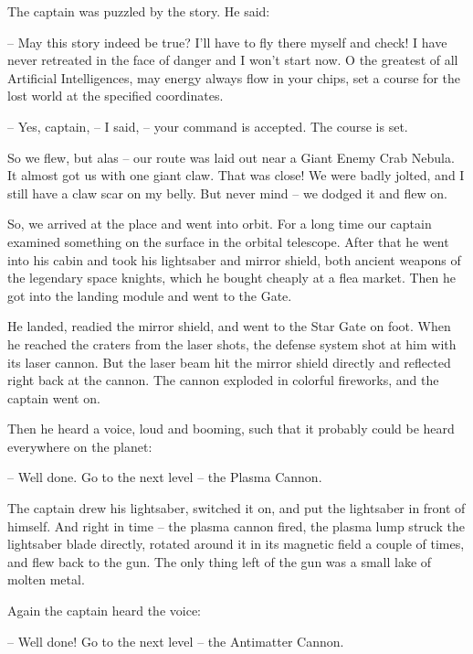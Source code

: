 \documentclass[ebook,twoside,final,openright]{memoir}
\begin{document}
\par
The captain was puzzled by the story. He said:\par
– May this story indeed be true? I’ll have to fly there myself and check! I have never retreated in the face of danger and I won’t start now. O the greatest of all Artificial Intelligences, may energy always flow in your chips, set a course for the lost world at the specified coordinates.\par
– Yes, captain, – I said, – your command is accepted. The course is set.\par
So we flew, but alas – our route was laid out near a Giant Enemy Crab Nebula. It almost got us with one giant claw. That was close! We were badly jolted, and I still have a claw scar on my belly. But never mind – we dodged it and flew on. \par
\par
So, we arrived at the place and went into orbit. For a long time our captain examined something on the surface in the orbital telescope. After that he went into his cabin and took his lightsaber and mirror shield, both ancient weapons of the legendary space knights, which he bought cheaply at a flea market. Then he got into the landing module and went to the Gate.\par
\par
He landed, readied the mirror shield, and went to the Star Gate on foot. When he reached the craters from the laser shots, the defense system shot at him with its laser cannon. But the laser beam hit the mirror shield directly and reflected right back at the cannon. The cannon exploded in colorful fireworks, and the captain went on.\par
\par
Then he heard a voice, loud and booming, such that it probably could be heard everywhere on the planet:\par
– Well done. Go to the next level – the Plasma Cannon.\par
The captain drew his lightsaber, switched it on, and put the lightsaber in front of himself. And right in time – the plasma cannon fired, the plasma lump struck the lightsaber blade directly, rotated around it in its magnetic field a couple of times, and flew back to the gun. The only thing left of the gun was a small lake of molten metal.\par
\par
Again the captain heard the voice:\par
– Well done! Go to the next level – the Antimatter Cannon.\par
\end{document}

